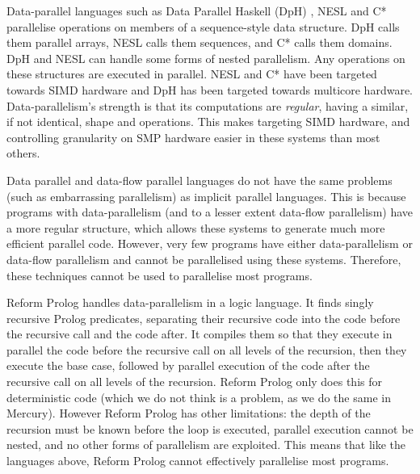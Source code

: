 Data-parallel languages such as
Data Parallel Haskell (DpH)
\citep{dph:2007:status_report,dph:2008:harnessing_the_multicores},
NESL
\citep{blelloch:95:nesl} and
C* \citep{rose:cstar}
parallelise operations on members of a sequence-style data structure.
DpH calls them parallel arrays,
NESL calls them sequences, and
C* calls them domains.
DpH and NESL can handle some forms of nested parallelism.
Any operations on these structures are executed in parallel.
NESL and C* have been targeted towards SIMD hardware
and DpH has been targeted towards multicore hardware.
Data-parallelism's strength is that its computations are \emph{regular},
having a similar, if not identical, shape and operations.
This makes targeting SIMD hardware,
and controlling granularity on SMP hardware easier in these systems than
most others.

Data parallel and data-flow parallel languages do not have the same
problems (such as embarrassing parallelism)
as implicit parallel languages.
This is because programs with data-parallelism
(and to a lesser extent data-flow parallelism)
have a more regular structure,
which allows these systems to generate much more efficient parallel code.
However, very few programs have either data-parallelism or data-flow
parallelism and cannot be parallelised using these systems.
Therefore, these techniques cannot be used to parallelise most programs.

Reform Prolog \citep{bevemyr:reform} 
handles data-parallelism in a logic language.
It finds singly recursive Prolog predicates,
separating their recursive code into the code before the recursive call and
the code after.
It compiles them so that they execute in parallel the code before the
recursive call on all levels of the recursion,
then they execute the base case,
followed by parallel execution of the code after the recursive call on all
levels of the recursion.
Reform Prolog only does this for deterministic code
(which we do not think is a problem, as we do the same in Mercury).
However Reform Prolog has other limitations:
the depth of the recursion must be known before the loop is executed,
parallel execution cannot be nested,
and no other forms of parallelism are exploited.
This means that like the languages above,
Reform Prolog cannot effectively parallelise most programs.

